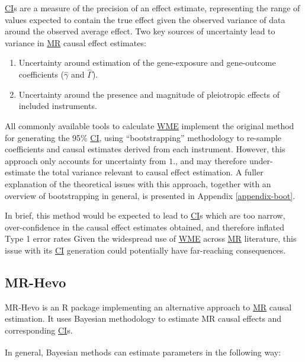 \documentclass[
]{article}
\begin{document}
\hyperref[acronyms_CI]{CI}s are a measure of the precision of an effect estimate, representing the range of values expected to contain the true effect given the observed variance of data around the observed average effect. Two key sources of uncertainty lead to variance in \hyperref[acronyms_MR]{MR} causal effect estimates:

\begin{enumerate}
\def\labelenumi{\arabic{enumi}.}
\item
  Uncertainty around estimation of the gene-exposure and gene-outcome coefficients (\(\hat{\gamma}\) and \(\hat{\Gamma}\)).
\item
  Uncertainty around the presence and magnitude of pleiotropic effects of included instruments.
\end{enumerate}

All commonly available tools to calculate \hyperref[acronyms_WME]{WME} implement the original method for generating the 95\% \hyperref[acronyms_CI]{CI}, using ``bootstrapping'' methodology to re-sample coefficients and causal estimates derived from each instrument. However, this approach only accounts for uncertainty from \(1.\), and may therefore under-estimate the total variance relevant to causal effect estimation. A fuller explanation of the theoretical issues with this approach, together with an overview of bootstrapping in general, is presented in Appendix \ref{appendix-boot}.

In brief, this method would be expected to lead to \hyperref[acronyms_CI]{CI}s which are too narrow, over-confidence in the causal effect estimates obtained, and therefore inflated Type 1 error rates Given the widespread use of \hyperref[acronyms_WME]{WME} across \hyperref[acronyms_MR]{MR} literature, this issue with its \hyperref[acronyms_CI]{CI} generation could potentially have far-reaching consequences.

\subsection{MR-Hevo}\label{mr-hevo}

MR-Hevo is an R package implementing an alternative approach to \hyperref[acronyms_MR]{MR} causal estimation. It uses Bayesian methodology to estimate MR causal effects and corresponding \hyperref[acronyms_CI]{CI}s.

In general, Bayesian methods can estimate parameters in the following way\textsuperscript{}:
\end{document}
